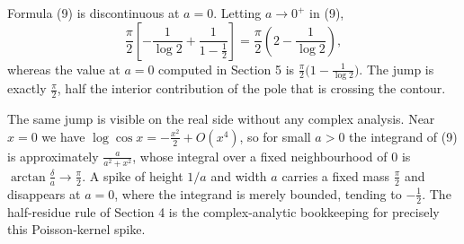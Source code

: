 \documentclass[12pt]{article}
\begin{document}
Formula (9) is discontinuous at \(a=0\). Letting
\(a\to0^+\) in (9),
\[
\frac\pi2\left[-\frac1{\log2}+\frac{1}{1-\frac12}\right]
=\frac\pi2\left(2-\frac1{\log2}\right),
\]
whereas the value at \(a=0\) computed in Section 5 is
\(\frac\pi2\bigl(1-\frac1{\log2}\bigr)\). The jump is exactly \(\frac\pi2\),
half the interior contribution of the pole that is crossing the contour.

The same jump is visible on the real side without any complex analysis.
Near \(x=0\) we have \(\log\cos x=-\frac{x^2}{2}+O(x^4)\), so for small
\(a>0\) the integrand of (9) is approximately \(\frac{a}{a^2+x^2}\),
whose integral over a fixed neighbourhood of \(0\) is
\(\arctan\frac{\delta}{a}\to\frac\pi2\). A spike of height \(1/a\) and
width \(a\) carries a fixed mass \(\frac\pi2\) and disappears at \(a=0\),
where the integrand is merely bounded, tending to \(-\frac12\). The
half-residue rule of Section 4 is the complex-analytic bookkeeping for
precisely this Poisson-kernel spike.
\end{document}
